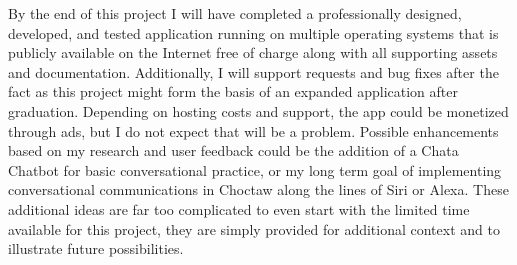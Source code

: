 \documentclass[12pt,letterpaper]{article}
\begin{document}
By the end of this project I will have completed a professionally designed, developed, and tested application running on multiple operating systems that is publicly available on the Internet free of charge along with all supporting assets and documentation. Additionally, I will support requests and bug fixes after the fact as this project might form the basis of an expanded application after graduation. Depending on hosting costs and support, the app could be monetized through ads, but I do not expect that will be a problem. Possible enhancements based on my research and user feedback could be the addition of a Chata Chatbot for basic conversational practice, or my long term goal of implementing conversational communications in Choctaw along the lines of Siri or Alexa. These additional ideas are far too complicated to even start with the limited time available for this project, they are simply provided for additional context and to illustrate future possibilities.
\end{document}
